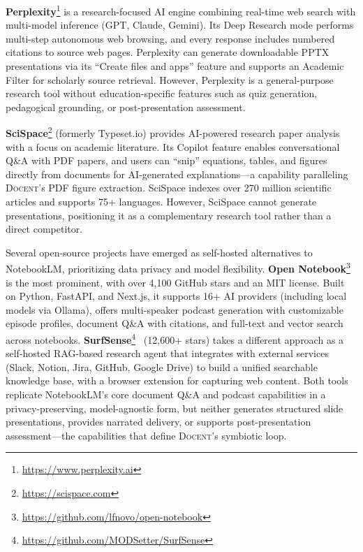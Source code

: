 \documentclass[11pt,a4paper]{article}
\newcommand{\system}{\textsc{Docent}\xspace}
\begin{document}
\textbf{Perplexity}\footnote{\url{https://www.perplexity.ai}} is a research-focused AI engine combining real-time web search with multi-model inference (GPT, Claude, Gemini).
Its Deep Research mode performs multi-step autonomous web browsing, and every response includes numbered citations to source web pages.
Perplexity can generate downloadable PPTX presentations via its ``Create files and apps'' feature and supports an Academic Filter for scholarly source retrieval.
However, Perplexity is a general-purpose research tool without education-specific features such as quiz generation, pedagogical grounding, or post-presentation assessment.

\textbf{SciSpace}\footnote{\url{https://scispace.com}} (formerly Typeset.io) provides AI-powered research paper analysis with a focus on academic literature.
Its Copilot feature enables conversational Q\&A with PDF papers, and users can ``snip'' equations, tables, and figures directly from documents for AI-generated explanations---a capability paralleling \system's PDF figure extraction.
SciSpace indexes over 270 million scientific articles and supports 75+ languages.
However, SciSpace cannot generate presentations, positioning it as a complementary research tool rather than a direct competitor.

Several open-source projects have emerged as self-hosted alternatives to NotebookLM, prioritizing data privacy and model flexibility.
\textbf{Open Notebook}\footnote{\url{https://github.com/lfnovo/open-notebook}}~\citep{opennotebook2025} is the most prominent, with over 4,100 GitHub stars and an MIT license.
Built on Python, FastAPI, and Next.js, it supports 16+ AI providers (including local models via Ollama), offers multi-speaker podcast generation with customizable episode profiles, document Q\&A with citations, and full-text and vector search across notebooks.
\textbf{SurfSense}\footnote{\url{https://github.com/MODSetter/SurfSense}}~\citep{surfsense2025} (12,600+ stars) takes a different approach as a self-hosted RAG-based research agent that integrates with external services (Slack, Notion, Jira, GitHub, Google Drive) to build a unified searchable knowledge base, with a browser extension for capturing web content.
Both tools replicate NotebookLM's core document Q\&A and podcast capabilities in a privacy-preserving, model-agnostic form, but neither generates structured slide presentations, provides narrated delivery, or supports post-presentation assessment---the capabilities that define \system's symbiotic loop.
\end{document}
